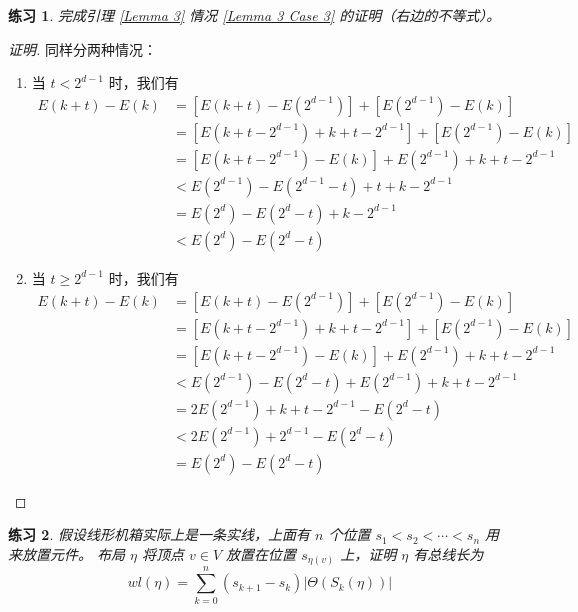 \documentclass[12pt, a4paper]{article}
\newtheorem{exercisewithanswer}{练习}
\begin{document}
\begin{exercisewithanswer}
完成引理 \ref{Lemma 3} 情况 \ref{Lemma 3 Case 3} 的证明（右边的不等式）。
\end{exercisewithanswer}

\begin{proof}[证明]
同样分两种情况：
\begin{enumerate}[(1)]
	\item 当 $t < 2^{d - 1}$ 时，我们有
		\begin{align*}
		E(k + t) - E(k) & = \left[E(k + t) - E(2^{d - 1})\right] +
				    \left[E(2^{d - 1}) - E(k)\right] \\
				& = \left[E(k + t - 2^{d - 1}) + k + t - 2^{d - 1}\right] +
				    \left[E(2^{d - 1}) - E(k)\right] \\
				& = \left[E(k + t - 2^{d - 1}) - E(k)\right] +
				    E(2^{d - 1}) + k + t - 2^{d - 1} \\
				& < E(2^{d - 1}) - E(2^{d - 1} - t) + t + k - 2^{d - 1} \\
				& = E(2^d) - E(2^d - t) + k - 2^{d - 1} \\
				& < E(2^d) - E(2^d - t)
		\end{align*}
	\item 当 $t \ge 2^{d - 1}$ 时，我们有
		\begin{align*}
		E(k + t) - E(k) & = \left[E(k + t) - E(2^{d - 1})\right] +
				    \left[E(2^{d - 1}) - E(k)\right] \\
				& = \left[E(k + t - 2^{d - 1}) + k + t - 2^{d - 1}\right] +
				    \left[E(2^{d - 1}) - E(k)\right] \\
				& = \left[E(k + t - 2^{d - 1}) - E(k)\right] +
				    E(2^{d - 1}) + k + t - 2^{d - 1} \\
				& < E(2^{d - 1}) - E(2^d - t) + E(2^{d - 1}) +
				    k + t - 2^{d - 1} \\
				& = 2 E(2^{d - 1}) + k + t - 2^{d - 1} - E(2^d - t) \\
				& < 2 E(2^{d - 1}) + 2^{d - 1} - E(2^d - t) \\
				& = E(2^d) - E(2^d - t)
		\end{align*}
\end{enumerate}
\end{proof}

\begin{exercisewithanswer}
假设线形机箱实际上是一条实线，上面有 $n$ 个位置 $s_1 < s_2 < \cdots < s_n$ 用来放置元件。
布局 $\eta$ 将顶点 $v \in V$ 放置在位置 $s_{\eta(v)}$ 上，证明 $\eta$ 有总线长为
\begin{equation*}
wl(\eta) = \sum_{k = 0}^n (s_{k + 1} - s_k) |\Theta(S_k(\eta))|
\end{equation*}
\end{exercisewithanswer}
\end{document}
